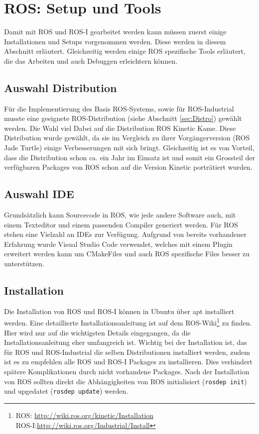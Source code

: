 \chapter{ROS: Setup und Tools}\label{sec:rosSetup}
Damit mit ROS und ROS-I gearbeitet werden kann müssen zuerst einige Installationen und Setups vorgenommen werden. Diese werden in diesem Abschnitt erläutert. Gleichzeitig werden einige ROS spezifische Tools erläutert, die das Arbeiten und auch Debuggen erleichtern können.
\section{Auswahl Distribution}
Für die Implementierung des Basis ROS-Systems, sowie für ROS-Industrial musste eine geeignete ROS-Distribution (siehe Abschnitt \ref{sec:Distro}) gewählt werden. Die Wahl viel Dabei auf die Distribution ROS Kinetic Kame. Diese Distribution wurde gewählt, da sie im Vergleich zu ihrer Vorgängerversion (ROS Jade Turtle) einige Verbesserungen mit sich bringt. Gleichzeitig ist es von Vorteil, dass die Distribution schon ca. ein Jahr im Einsatz ist und somit ein Grossteil der verfügbaren Packages von ROS schon auf die Version Kinetic porträtiert wurden.

\section{Auswahl IDE}
Grundsätzlich kann Sourcecode in ROS, wie jede andere Software auch, mit einem Texteditor und einem passenden Compiler generiert werden. Für ROS stehen eine Vielzahl an \glspl{IDE} zur Verfügung. Aufgrund von bereits vorhandener Erfahrung wurde Visual Studio Code verwendet, welches mit einem Plugin erweitert werden kann um CMakeFiles und auch ROS spezifische Files besser zu unterstützen. 

\section{Installation}
Die Installation von ROS und ROS-I können in Ubuntu über \gls{apt} installiert werden. Eine detaillierte Installationsanleitung ist auf dem ROS-Wiki\footnote{ROS: \url{http://wiki.ros.org/kinetic/Installation}\\ROS-I:\url{http://wiki.ros.org/Industrial/Install}} zu finden. Hier wird nur auf die wichtigsten Details eingegangen, da die Installationsanleitung eher umfangreich ist. Wichtig bei der Installation ist, das für ROS und ROS-Industrial die selben Distributionen installiert werden, zudem ist es zu empfehlen alle ROS und ROS-I Packages zu installieren. Dies verhindert spätere Komplikationen durch nicht vorhandene Packages. Nach der Installation von ROS sollten direkt die Abhängigkeiten von ROS initialisiert (\texttt{rosdep init}) und upgedatet (\texttt{rosdep update}) werden.\\
\newpage
